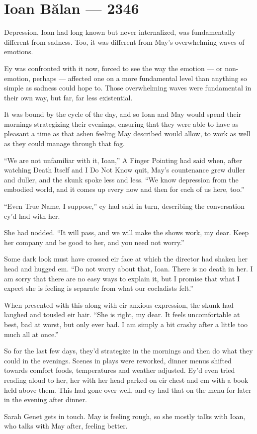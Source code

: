 \hypertarget{ioan-bux103lan-2346}{%
\chapter{Ioan Bălan — 2346}\label{ioan-bux103lan-2346}}

Depression, Ioan had long known but never internalized, was fundamentally different from sadness. Too, it was different from May's overwhelming waves of emotions.

Ey was confronted with it now, forced to see the way the emotion — or non-emotion, perhaps — affected one on a more fundamental level than anything so simple as sadness could hope to. Those overwhelming waves were fundamental in their own way, but far, far less existential.

It was bound by the cycle of the day, and so Ioan and May would spend their mornings strategizing their evenings, ensuring that they were able to have as pleasant a time as that ashen feeling May described would allow, to work as well as they could manage through that fog.

``We are not unfamiliar with it, Ioan,'' A Finger Pointing had said when, after watching Death Itself and I Do Not Know quit, May's countenance grew duller and duller, and the skunk spoke less and less. ``We know depression from the embodied world, and it comes up every now and then for each of us here, too.''

``Even True Name, I suppose,'' ey had said in turn, describing the conversation ey'd had with her.

She had nodded. ``It will pass, and we will make the shows work, my dear. Keep her company and be good to her, and you need not worry.''

Some dark look must have crossed eir face at which the director had shaken her head and hugged em. ``Do not worry about that, Ioan. There is no death in her. I am sorry that there are no easy ways to explain it, but I promise that what I expect she is feeling is separate from what our cocladists felt.''

When presented with this along with eir anxious expression, the skunk had laughed and tousled eir hair. ``She is right, my dear. It feels uncomfortable at best, bad at worst, but only ever bad. I am simply a bit crashy after a little too much all at once.''

So for the last few days, they'd strategize in the mornings and then do what they could in the evenings. Scenes in plays were reworked, dinner menus shifted towards comfort foods, temperatures and weather adjusted. Ey'd even tried reading aloud to her, her with her head parked on eir chest and em with a book held above them. This had gone over well, and ey had that on the menu for later in the evening after dinner.

Sarah Genet gets in touch. May is feeling rough, so she mostly talks with Ioan, who talks with May after, feeling better.
